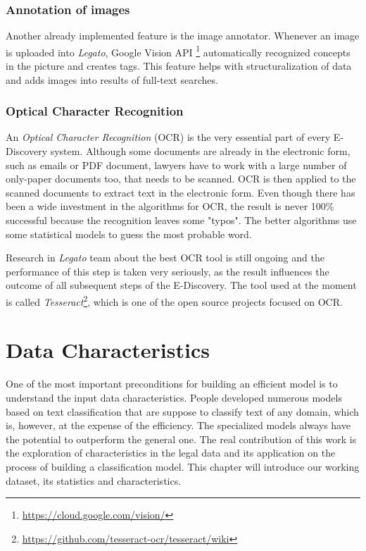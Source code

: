 \documentclass[
  digital, %
  notable,   %
  nolof,     %
  nolot,     %
  draft
]{fithesis3}
\begin{document}
\subsection*{Annotation of images}
Another already implemented feature is the image annotator.
Whenever an image is uploaded into \textit{Legato}, Google Vision API \footnote{\url{https://cloud.google.com/vision/}} automatically recognized concepts in the picture and creates tags.
This feature helps with structuralization of data and adds images into results of full-text searches.

\subsection*{Optical Character Recognition}
An \textit{Optical Character Recognition} (OCR) is the very essential part of every E-Discovery system.
Although some documents are already in the electronic form, such as emails or PDF document, lawyers have to work with a large number of only-paper documents too, that needs to be scanned.
OCR is then applied to the scanned documents to extract text in the electronic form.
Even though there has been a wide investment in the algorithms for OCR, the result is never 100\% successful because the recognition leaves some "typos".
The better algorithms use some statistical models to guess the most probable word.

Research in \textit{Legato} team about the best OCR tool is still ongoing and the performance of this step is taken very seriously, as the result influences the outcome of all subsequent steps of the E-Discovery. The tool used at the moment is called \textit{Tesseract}\footnote{\url{https://github.com/tesseract-ocr/tesseract/wiki}}, which is one of the open source projects focused on OCR.



\chapter{Data Characteristics}
\label{chp:data_characteristics}
One of the most important preconditions for building an efficient model is to understand the input data characteristics.
People developed numerous models based on text classification that are suppose to classify text of any domain, which is, however, at the expense of the efficiency.
The specialized models always have the potential to outperform the general one.
The real contribution of this work is the exploration of characteristics in the legal data and its application on the process of building a classification model.
This chapter will introduce our working dataset, its statistics and characteristics.
\end{document}
